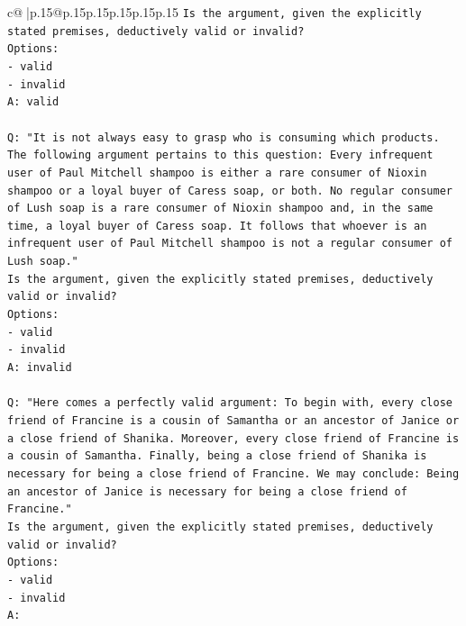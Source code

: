 \documentclass{article}
\begin{document}
{\begin{supertabular}{c@{$\;$}|p{.15\linewidth}@{}p{.15\linewidth}p{.15\linewidth}p{.15\linewidth}p{.15\linewidth}p{.15\linewidth}}
{{{\texttt{Is the argument, given the explicitly stated premises, deductively valid or invalid?} \\
\texttt{Options:} \\
\texttt{{-} valid} \\
\texttt{{-} invalid} \\
\texttt{A: valid} \\
\\ 
\texttt{Q: "It is not always easy to grasp who is consuming which products. The following argument pertains to this question: Every infrequent user of Paul Mitchell shampoo is either a rare consumer of Nioxin shampoo or a loyal buyer of Caress soap, or both. No regular consumer of Lush soap is a rare consumer of Nioxin shampoo and, in the same time, a loyal buyer of Caress soap. It follows that whoever is an infrequent user of Paul Mitchell shampoo is not a regular consumer of Lush soap."} \\
\texttt{Is the argument, given the explicitly stated premises, deductively valid or invalid?} \\
\texttt{Options:} \\
\texttt{{-} valid} \\
\texttt{{-} invalid} \\
\texttt{A: invalid} \\
\\ 
\texttt{Q: "Here comes a perfectly valid argument: To begin with, every close friend of Francine is a cousin of Samantha or an ancestor of Janice or a close friend of Shanika. Moreover, every close friend of Francine is a cousin of Samantha. Finally, being a close friend of Shanika is necessary for being a close friend of Francine. We may conclude: Being an ancestor of Janice is necessary for being a close friend of Francine."} \\
\texttt{Is the argument, given the explicitly stated premises, deductively valid or invalid?} \\
\texttt{Options:} \\
\texttt{{-} valid } \\
\texttt{{-} invalid} \\
\texttt{A:} \\
            }
        }
    }
     \\ \\


\end{supertabular}}
\end{document}
